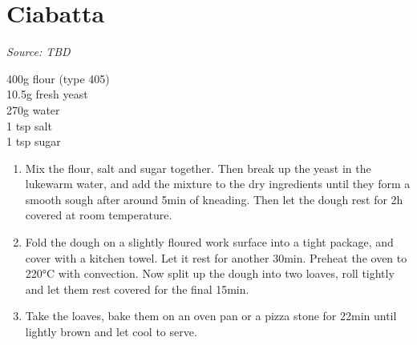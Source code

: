 \documentclass{report}
\begin{document}
\section{Ciabatta}
\textit{Source: TBD}\\
\begin{minipage}[t]{0.21\textwidth} \vspace{0pt} 
400g flour (type 405)\\
10.5g fresh yeast\\
270g water\\
1 tsp salt\\
1 tsp sugar\\
\end{minipage}
\hfill
\begin{minipage}[t]{0.78\textwidth} \vspace{0pt}
	\begin{enumerate}
		\item Mix  the flour, salt and sugar together. Then break up the yeast in the lukewarm water, and add the mixture to the dry ingredients until they form a smooth sough after around 5min of kneading. Then let the dough rest for 2h covered at room temperature.
		\item Fold the dough on a slightly floured work surface into a tight package, and cover with a kitchen towel. Let it rest for another 30min. Preheat the oven to 220°C with convection. Now split up the dough into two loaves, roll tightly and let them rest covered for the final 15min.
		\item Take the loaves, bake them on an oven pan or a pizza stone for 22min until lightly brown and let cool to serve.
	\end{enumerate}	
\end{minipage}
\end{document}

